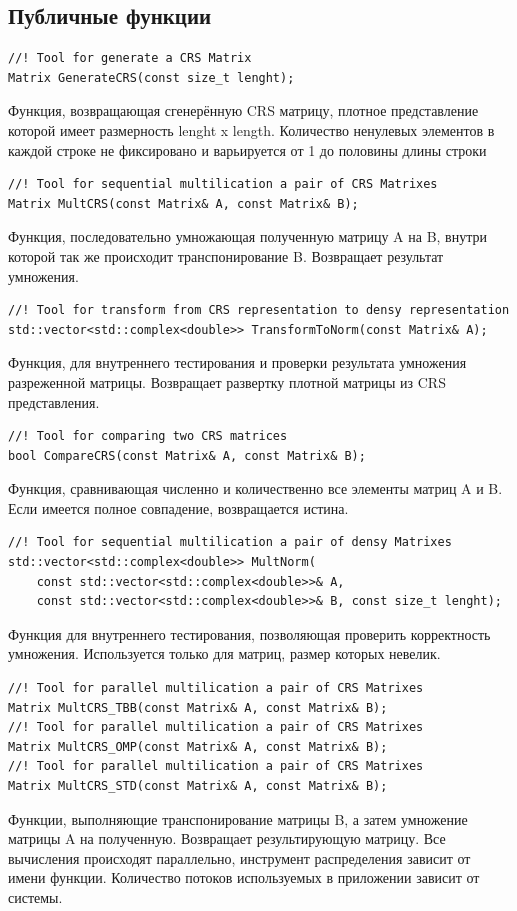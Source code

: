 \documentclass{report}
\begin{document}
\subsection*{Публичные функции}
\begin{lstlisting}
//! Tool for generate a CRS Matrix
Matrix GenerateCRS(const size_t lenght);
\end{lstlisting}
\par Функция, возвращающая сгенерённую CRS матрицу, плотное представление которой имеет размерность lenght x length. Количество ненулевых элементов в каждой строке не фиксировано и варьируется от 1 до половины длины строки
\begin{lstlisting}
//! Tool for sequential multilication a pair of CRS Matrixes
Matrix MultCRS(const Matrix& A, const Matrix& B);
\end{lstlisting}
\par Функция, последовательно умножающая полученную матрицу A на B, внутри которой так же происходит транспонирование B. Возвращает результат умножения.
\begin{lstlisting}
//! Tool for transform from CRS representation to densy representation
std::vector<std::complex<double>> TransformToNorm(const Matrix& A);
\end{lstlisting}
\par Функция, для внутреннего тестирования и проверки результата умножения разреженной матрицы. Возвращает развертку плотной матрицы из CRS представления.
\begin{lstlisting}
//! Tool for comparing two CRS matrices
bool CompareCRS(const Matrix& A, const Matrix& B);
\end{lstlisting}
\par Функция, сравнивающая численно и количественно все элементы матриц A и B. Если имеется полное совпадение, возвращается истина.
\begin{lstlisting}
//! Tool for sequential multilication a pair of densy Matrixes
std::vector<std::complex<double>> MultNorm(
    const std::vector<std::complex<double>>& A,
    const std::vector<std::complex<double>>& B, const size_t lenght);
\end{lstlisting}
\par Функция для внутреннего тестирования, позволяющая проверить корректность умножения. Используется только для матриц, размер которых невелик.
\begin{lstlisting}
//! Tool for parallel multilication a pair of CRS Matrixes
Matrix MultCRS_TBB(const Matrix& A, const Matrix& B);
//! Tool for parallel multilication a pair of CRS Matrixes
Matrix MultCRS_OMP(const Matrix& A, const Matrix& B);
//! Tool for parallel multilication a pair of CRS Matrixes
Matrix MultCRS_STD(const Matrix& A, const Matrix& B);
\end{lstlisting}
\par Функции, выполняющие транспонирование матрицы B, а затем умножение матрицы A на полученную. Возвращает результирующую матрицу. Все вычисления происходят параллельно, инструмент распределения зависит от имени функции. Количество потоков используемых в приложении зависит от системы.
\newpage
\end{document}
